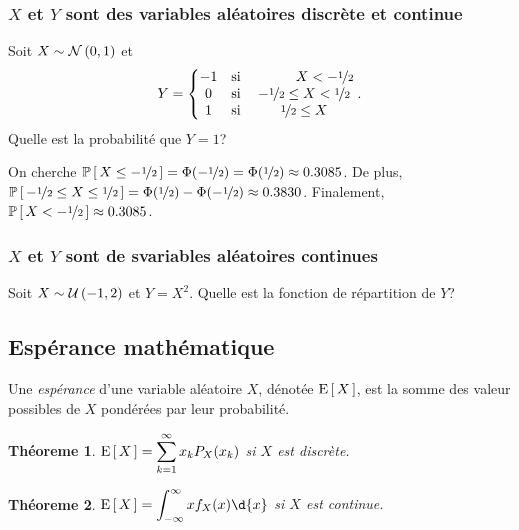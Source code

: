 \documentclass[11pt]{article}
\renewcommand\P[1]{%
	\ensuremath{%
		\mathbb{P}\left[\,#1\,\right]%
	}%
}%
\newcommand\Uni[2]{%
	\ensuremath{%
		\mathcal{U}\left(#1,#2\right)%
	}%
}%
\newcommand\Norm[2]{%
	\ensuremath{%
		\mathcal{N}\left(#1,#2\right)%
	}%
}%
\newcommand\Esp[1]{%
	\ensuremath{%
		\mathrm{E}\left[\,#1\,\right]%
	}%
}%
\newtheorem{theoreme}{Théoreme}[section]
\begin{document}
\subsubsection{$X$ et $Y$ sont des variables aléatoires discrète et continue}
\begin{exemple}
	Soit $X\sim\Norm{0}{1}$ et
	\begin{equation*}
		Y=\left\{
			\begin{matrix}
				-1&\text{si}&\phantom{-\nicefrac{1}{2}\leq}X<-\nicefrac{1}{2}\\
				 0&\text{si}&-\nicefrac{1}{2}\leq X<\nicefrac{1}{2}\\
				 1&\text{si}&\nicefrac{1}{2}\leq X\\
			\end{matrix}
		\right..
	\end{equation*}
	Quelle est la probabilité que $Y=1$?

	On cherche $\P{X\leq-\nicefrac{1}{2}}=\Phi(-\nicefrac{1}{2})=
	\Phi(\nicefrac{1}{2})\approx\SI{0.3085}{}$. De plus, $\P{-\nicefrac{1}{2}
	\leq X\leq\nicefrac{1}{2}}=\Phi(\nicefrac{1}{2})-\Phi(-\nicefrac{1}{2})
	\approx\SI{0.3830}{}$. Finalement, $\P{X<-\nicefrac{1}{2}}\approx
	\SI{0.3085}{}$.
\end{exemple}

\subsubsection{$X$ et $Y$ sont de svariables aléatoires continues}
\begin{exemple}
	Soit $X\sim\Uni{-1}{2}$ et $Y=X^2$. Quelle est la fonction de répartition de
	$Y$?
\end{exemple}

\subsection{Espérance mathématique}
\begin{definition}
	Une \textit{espérance} d'une variable aléatoire $X$, dénotée $\Esp{X}$, est
	la somme des valeur possibles de $X$ pondérées par leur probabilité.
\end{definition}

\begin{theoreme}
	$\Esp{X}=\displaystyle\sum_{k=1}^\infty x_kP_X(x_k)$ si $X$ est discrète.
\end{theoreme}

\begin{theoreme}
	$\Esp{X}=\displaystyle\int_{-\infty}^\infty xf_X(x)\d{x}$ si $X$ est
	continue.
\end{theoreme}
\end{document}
